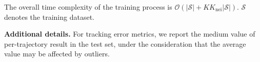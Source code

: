 The overall time complexity of the  training process is $\mathcal{O}(\vert \mathcal{S}\vert + KK_{\text{nei}}\vert \mathcal{S}\vert)$. $\mathcal{S}$ denotes the training dataset. 






\noindent\textbf{Additional details.} For tracking error metrics, we report the medium value of per-trajectory result in the test set, under the consideration that the average value may be affected by outliers. 



